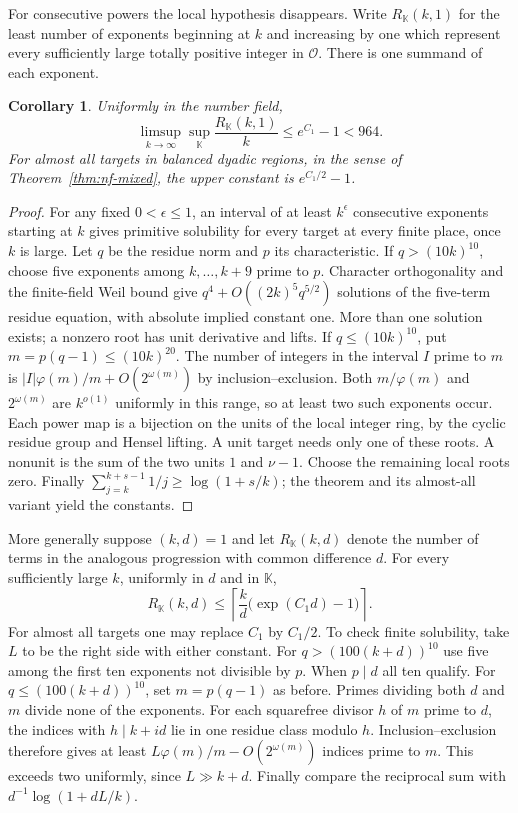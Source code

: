 \documentclass[11pt,letterpaper]{article}
\newtheorem{corollary}[corollary]{Corollary}
\theoremstyle{definition}
\numberwithin{equation}{section}
\begin{document}
For consecutive powers the local hypothesis disappears. Write
$R_{\mathbb K}(k,1)$ for the least number of exponents beginning at $k$
and increasing by one which represent every sufficiently large totally
positive integer in $\mathcal O$. There is one summand of each exponent.
\begin{corollary}\label{cor:nf-mixed-consecutive}
Uniformly in the number field,
\[
 \limsup_{k\to\infty}\sup_{\mathbb K}
         \frac{R_{\mathbb K}(k,1)}{k}\le e^{C_1}-1<964.
\]
For almost all targets in balanced dyadic regions, in the sense of
Theorem~\ref{thm:nf-mixed}, the upper constant is $e^{C_1/2}-1$.
\end{corollary}
\begin{proof}
For any fixed $0<\epsilon\le1$, an interval of at least $k^\epsilon$
consecutive exponents starting at $k$ gives primitive solubility
for every target at every finite place, once $k$ is large. Let $q$
be the residue norm and $p$ its characteristic. If $q>(10k)^{10}$,
choose five exponents among $k,\ldots,k+9$ prime to $p$. Character
orthogonality and the finite-field Weil bound give $q^4+
O((2k)^5q^{5/2})$ solutions of the five-term residue equation,
with absolute implied constant one. More than one solution exists;
a nonzero root has unit derivative and lifts.
If $q\le(10k)^{10}$, put $m=p(q-1)\le(10k)^{20}$. The number of
integers in the interval $I$ prime to $m$ is
$|I|\varphi(m)/m+O(2^{\omega(m)})$ by inclusion--exclusion.
Both $m/\varphi(m)$ and $2^{\omega(m)}$ are $k^{o(1)}$ uniformly in
this range, so at least two such exponents occur. Each power map
is a bijection on the units of the local integer ring, by the cyclic
residue group and Hensel lifting. A unit target needs only one of
these roots. A nonunit is the sum of the two units $1$ and $\nu-1$.
Choose the remaining local roots zero. Finally
$\sum_{j=k}^{k+s-1}1/j\ge\log(1+s/k)$; the theorem and its
almost-all variant yield the constants.
\end{proof}

More generally suppose $(k,d)=1$ and let $R_{\mathbb K}(k,d)$ denote
the number of terms in the analogous progression with common difference $d$.
For every sufficiently large $k$, uniformly in $d$ and in $\mathbb K$,
\begin{equation}\label{eq:nf-mixed-arbitrary-step}
 R_{\mathbb K}(k,d)\le
 \left\lceil\frac{k}{d}\big(\exp(C_1 d)-1\big)\right\rceil .
\end{equation}
For almost all targets one may replace $C_1$ by $C_1/2$.
To check finite solubility, take $L$ to be the right side with either
constant. For $q>(100(k+d))^{10}$ use five among the first ten exponents
not divisible by $p$. When $p\mid d$ all ten qualify. For
$q\le(100(k+d))^{10}$, set $m=p(q-1)$ as before. Primes dividing
both $d$ and $m$ divide none of the exponents. For each squarefree
divisor $h$ of $m$ prime to $d$, the indices with
$h\mid k+id$ lie in one residue class modulo $h$. Inclusion--exclusion
therefore gives at least $L\varphi(m)/m-O(2^{\omega(m)})$ indices
prime to $m$. This exceeds two uniformly, since $L\gg k+d$.
Finally compare the reciprocal sum with $d^{-1}\log(1+dL/k)$.
\end{document}
